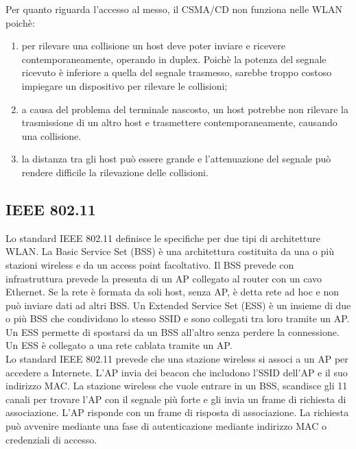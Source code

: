 \documentclass[12pt]{report}
\begin{document}
Per quanto riguarda l'accesso al messo, il CSMA/CD non funziona nelle WLAN poichè:
\begin{enumerate}
	\item per rilevare una collisione un host deve poter inviare e ricevere contemporaneamente, operando in duplex. Poichè la potenza del segnale ricevuto è inferiore a quella del segnale trasmesso, sarebbe troppo costoso impiegare un dispositivo per rilevare le collisioni;
	\item a causa del problema del terminale nascosto, un host potrebbe non rilevare la trasmissione di un altro host e trasmettere contemporaneamente, causando una collisione.
	\item la distanza tra gli host può essere grande e l'attenuazione del segnale può rendere difficile la rilevazione delle collisioni.
\end{enumerate}

\subsection{IEEE 802.11}
Lo standard IEEE 802.11 definisce le specifiche per due tipi di architetture WLAN. La Basic Service Set (BSS) è una architettura costituita da una o più stazioni wireless e da un access point facoltativo. Il BSS prevede con infrastruttura prevede la presenta di un AP collegato al router con un cavo Ethernet. Se la rete è formata da soli host, senza AP, è detta rete ad hoc e non può inviare dati ad altri BSS. Un Extended Service Set (ESS) è un insieme di due o più BSS che condividono lo stesso SSID e sono collegati tra loro tramite un AP. Un ESS permette di spostarsi da un BSS all'altro senza perdere la connessione. Un ESS è collegato a una rete cablata tramite un AP.
\vspace{\baselineskip}\\
Lo standard IEEE 802.11 prevede che una stazione wireless si associ a un AP per accedere a Internete. L'AP invia dei beacon che includono l'SSID dell'AP e il suo indirizzo MAC. La stazione wireless che vuole entrare in un BSS, scandisce gli 11 canali per trovare l'AP con il segnale più forte e gli invia un frame di richiesta di associazione. L'AP risponde con un frame di risposta di associazione. La richiesta può avvenire mediante una fase di autenticazione mediante indirizzo MAC o credenziali di accesso.
\end{document}
